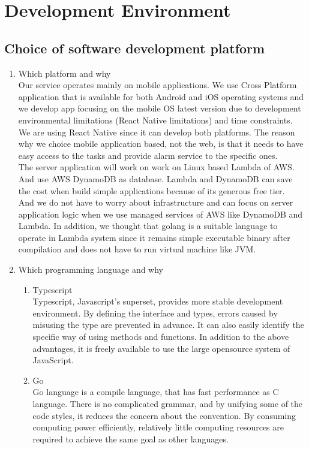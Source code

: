 \documentclass[conference]{IEEEtran}
\begin{document}
\section{Development Environment}


\subsection{Choice of software development platform}

\begin{enumerate}
    \item Which platform and why \\
    Our service operates mainly on mobile applications. We use Cross Platform application that is available for both Android and iOS operating systems and we develop app focusing on the mobile OS latest version due to development environmental limitations (React Native limitations) and time constraints. We are using React Native since it can develop both platforms. The reason why we choice mobile application based, not the web, is that it needs to have easy access to the tasks and provide alarm service to the specific ones. \\
    
    The server application will work on work on Linux based Lambda of AWS. And use AWS DynamoDB as database. Lambda and DynamoDB can save the cost when build simple applications because of its generous free tier. \\
    
    And we do not have to worry about infrastructure and can focus on server application logic when we use managed services of AWS like DynamoDB and Lambda. In addition, we thought that golang is a suitable language to operate in Lambda system since it remains simple executable binary after compilation and does not have to run virtual machine like JVM.\\
    
    \item Which programming language and why
    \begin{enumerate}
        \item Typescript \\
        Typescript, Javascript's superset, provides more stable development environment. By defining the interface and types, errors caused by misusing the type are prevented in advance. It can also easily identify the specific way of using methods and functions. In addition to the above advantages, it is freely available to use the large opensource system of JavaScript.\\
        \item Go \\
        Go language is a compile language, that has fast performance as C language. There is no complicated grammar, and by unifying some of the code styles, it reduces the concern about the convention. By consuming computing power efficiently, relatively little computing resources are required to achieve the same goal as other languages.\\
        

\end{enumerate}
\end{enumerate}
\end{document}
